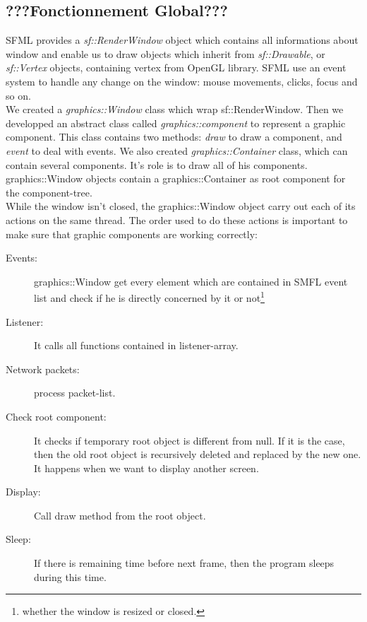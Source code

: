 \documentclass{scrreprt}
\begin{document}
					  \subsection{???Fonctionnement Global???} %
					  SFML provides a \emph{sf::RenderWindow} object which contains all informations about window and enable us to draw objects which inherit from \emph{sf::Drawable}, or \emph{sf::Vertex} objects, containing vertex from OpenGL library. SFML use an event system to handle any change on the window: mouse movements, clicks, focus and so on.\\

					  We created a \emph{graphics::Window} class which wrap sf::RenderWindow. Then we developped an abstract class called \emph{graphics::component} to represent a graphic component. This class contains two methods: \emph{draw} to draw a component, and \emph{event} to deal with events.
					  We also created \emph{graphics::Container} class, which can contain several components. It's role is to draw all of his components. graphics::Window objects contain a graphics::Container as root component for the component-tree.\\

					  While the window isn't closed, the graphics::Window object carry out each of its actions on the same thread. The order used to do these actions is important to make sure that graphic components are working correctly:
					  \begin{description}
					  \item[Events:]{graphics::Window get every element which are contained in SMFL event list and check if he is directly concerned by it or not\footnote{whether the window is resized or closed.}}
					  \item[Listener:]{It calls all functions contained in listener-array.}
					  \item[Network packets:]{process packet-list.}
					  \item[Check root component:] It checks if temporary root object is different from null. If it is the case, then the old root object is recursively deleted and replaced by the new one. It happens when we want to display another screen.
					  \item[Display:]{Call draw method from the root object.}
					  \item[Sleep:]{If there is remaining time before next frame, then the program sleeps during this time.}
					  \end{description}
\end{document}
